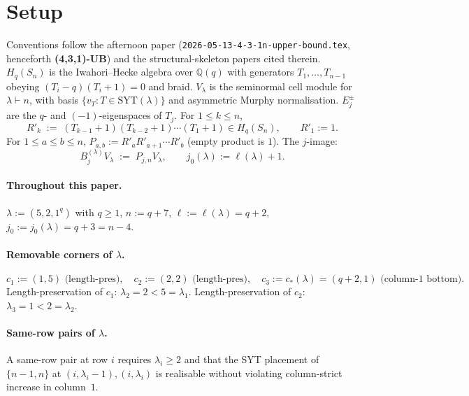 \documentclass[11pt]{article}
\theoremstyle{definition}
\begin{document}
\begin{abstract}
\textbf{Significance.} This is the second structural-$j$-formula
family of size $|\hat\lambda| = 7$ after $(4, 3, 1^q)$. Combined,
the two papers complete the $|\hat\lambda| = 7$ row of the
SRD ladder, both at the threshold predicted by the night
$T_1 = -1$ theorem ($q_0((5,2)) = q_0((4,3)) = 5$). Computational
verification gives $\dim B = 4$ at $q = 5$ and the expected
non-stable behaviour below.
\end{abstract}

\section{Setup}\label{sec:setup}

Conventions follow the afternoon paper
(\texttt{2026-05-13-4-3-1n-upper-bound.tex}, henceforth
\textbf{(4,3,1)-UB}) and the structural-skeleton papers cited
therein. $H_q(S_n)$ is the Iwahori--Hecke algebra over $\mathbb{Q}(q)$
with generators $T_1, \ldots, T_{n-1}$ obeying $(T_i - q)(T_i + 1) = 0$
and braid. $V_\lambda$ is the seminormal cell module for
$\lambda \vdash n$, with basis $\{v_T : T \in \mathrm{SYT}(\lambda)\}$
and asymmetric Murphy normalisation. $E_j^\pm$ are the $q$- and
$(-1)$-eigenspaces of $T_j$. For $1 \le k \le n$,
\[
   R'_k \;:=\; (T_{k-1}{+}1)(T_{k-2}{+}1)\cdots(T_1{+}1) \in H_q(S_n),
   \qquad R'_1 := 1.
\]
For $1 \le a \le b \le n$, $P_{a, b} := R'_a R'_{a+1} \cdots R'_b$
(empty product is $1$). The $j$-image:
\[
   B^{(\lambda)}_j V_\lambda \;:=\; P_{j, n} V_\lambda,
   \qquad j_0(\lambda) := \ell(\lambda) + 1.
\]

\paragraph{Throughout this paper.}
$\lambda := (5, 2, 1^q)$ with $q \ge 1$, $n := q + 7$,
$\ell := \ell(\lambda) = q + 2$, $j_0 := j_0(\lambda) = q + 3 = n - 4$.

\paragraph{Removable corners of $\lambda$.}
\[
   c_1 := (1, 5) \text{ (length-pres)},
   \quad
   c_2 := (2, 2) \text{ (length-pres)},
   \quad
   c_3 := c_*(\lambda) = (q+2, 1) \text{ (column-$1$ bottom)}.
\]
Length-preservation of $c_1$: $\lambda_2 = 2 < 5 = \lambda_1$. \checkmark
Length-preservation of $c_2$: $\lambda_3 = 1 < 2 = \lambda_2$. \checkmark

\paragraph{Same-row pairs of $\lambda$.}
A same-row pair at row $i$ requires $\lambda_i \ge 2$ and that the SYT
placement of $\{n-1, n\}$ at $(i, \lambda_i - 1), (i, \lambda_i)$ is
realisable without violating column-strict increase in column~$1$.
\end{document}
